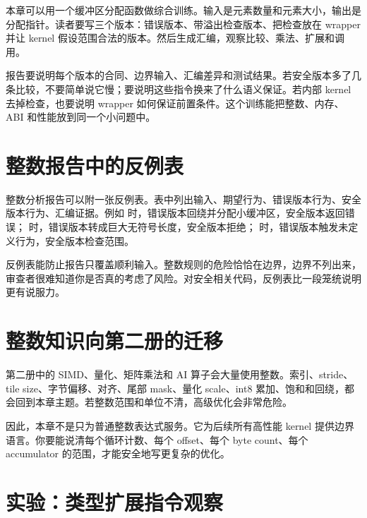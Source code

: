 本章可以用一个缓冲区分配函数做综合训练。输入是元素数量和元素大小，输出是分配指针。读者要写三个版本：错误版本、带溢出检查版本、把检查放在 wrapper 并让 kernel 假设范围合法的版本。然后生成汇编，观察比较、乘法、扩展和调用。

报告要说明每个版本的合同、边界输入、汇编差异和测试结果。若安全版本多了几条比较，不要简单说它慢；要说明这些指令换来了什么语义保证。若内部 kernel 去掉检查，也要说明 wrapper 如何保证前置条件。这个训练能把整数、内存、ABI 和性能放到同一个小问题中。

\section{整数报告中的反例表}

整数分析报告可以附一张反例表。表中列出输入、期望行为、错误版本行为、安全版本行为、汇编证据。例如  时，错误版本回绕并分配小缓冲区，安全版本返回错误； 时，错误版本转成巨大无符号长度，安全版本拒绝； 时，错误版本触发未定义行为，安全版本检查范围。

反例表能防止报告只覆盖顺利输入。整数规则的危险恰恰在边界，边界不列出来，审查者很难知道你是否真的考虑了风险。对安全相关代码，反例表比一段笼统说明更有说服力。

\section{整数知识向第二册的迁移}

第二册中的 SIMD、量化、矩阵乘法和 AI 算子会大量使用整数。索引、stride、tile size、字节偏移、对齐、尾部 mask、量化 scale、int8 累加、饱和和回绕，都会回到本章主题。若整数范围和单位不清，高级优化会非常危险。

因此，本章不是只为普通整数表达式服务。它为后续所有高性能 kernel 提供边界语言。你要能说清每个循环计数、每个 offset、每个 byte count、每个 accumulator 的范围，才能安全地写更复杂的优化。

\section{实验：类型扩展指令观察}

